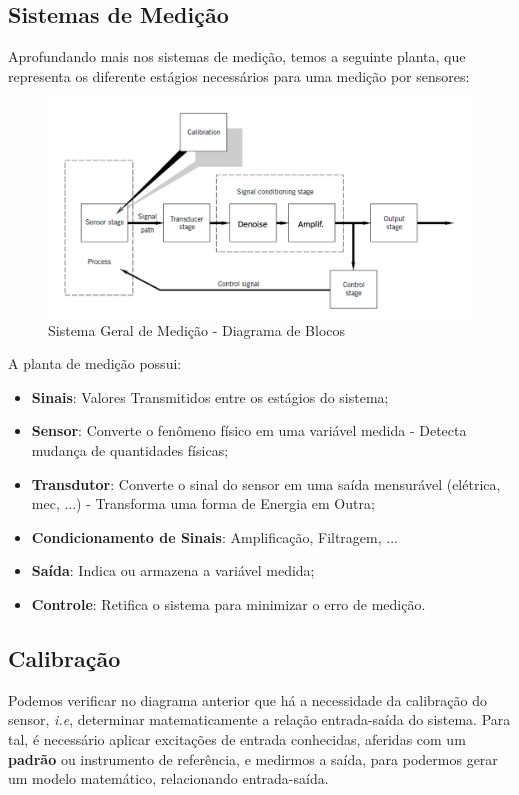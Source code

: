 \documentclass{article}
\begin{document}
        \subsection{Sistemas de Medição}
            Aprofundando mais nos sistemas de medição, temos a seguinte planta, que representa os diferente estágios necessários para uma medição por sensores:

            \begin{figure}[h]
                \centering
                \includegraphics[width=.7\textwidth]{imgs/sys_medi.png}
                \caption{Sistema Geral de Medição - Diagrama de Blocos}
            \end{figure}

            A planta de medição possui:
            \begin{itemize}
                \item \textbf{Sinais}: Valores Transmitidos entre os estágios do sistema;
                \item \textbf{Sensor}: Converte o fenômeno físico em uma variável medida - Detecta mudança de quantidades físicas;
                \item \textbf{Transdutor}: Converte o sinal do sensor em uma saída mensurável (elétrica, mec, ...) - Transforma uma forma de Energia em Outra;
                \item \textbf{Condicionamento de Sinais}: Amplificação, Filtragem, ...
                \item \textbf{Saída}: Indica ou armazena a variável medida;
                \item \textbf{Controle}: Retifica o sistema para minimizar o erro de medição.
            \end{itemize}

        \subsection{Calibração}
            Podemos verificar no diagrama anterior que há a necessidade da calibração do sensor, \emph{i.e}, determinar matematicamente a relação entrada-saída do sistema.
            Para tal, é necessário aplicar excitações de entrada conhecidas, aferidas com um \textbf{padrão} ou instrumento de referência, e medirmos a saída, para podermos gerar um modelo matemático,
            relacionando entrada-saída.
\end{document}
